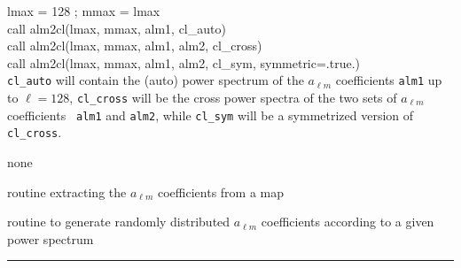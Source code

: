 \begin{example}
{
lmax = 128 ; mmax = lmax \\
call alm2cl(lmax, mmax, alm1, cl\_auto)  \\
call alm2cl(lmax, mmax, alm1, alm2, cl\_cross)  \\
call alm2cl(lmax, mmax, alm1, alm2, cl\_sym, symmetric=.true.)  \\
}
{
{\tt cl\_auto} will contain the (auto) power spectrum of the $a_{\ell m}$ coefficients {\tt alm1} up to $\ell = 128$,
{\tt cl\_cross} will be the cross power spectra of the two sets of $a_{\ell m}$ coefficients {\tt
  alm1} and {\tt alm2}, 
while {\tt cl\_sym} will be a symmetrized version of {\tt cl\_cross}.
}
\end{example}

\begin{modules}
  \begin{sulist}{} %
  \item[none]
  \end{sulist}
\end{modules}

\begin{related}
  \begin{sulist}{} %
  \item[\htmlref{map2alm}{sub:map2alm}] routine extracting the $a_{\ell m}$
  coefficients from a \healpix map
  \item[\htmlref{create\_alm}{sub:create_alm}] routine to generate randomly
  distributed $a_{\ell m}$ coefficients according to a given power spectrum
  \end{sulist}
\end{related}

\rule{\hsize}{2mm}

\newpage
